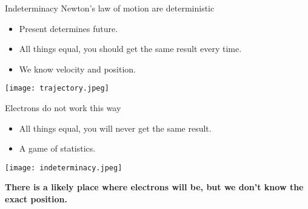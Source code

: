 \documentclass[notes=hide]{beamer}
\begin{document}
\begin{frame}[allowframebreaks=1]{Indeterminacy}
		Newton's law of motion are deterministic
			\begin{itemize}
				\item Present determines future.
				\item All things equal, you should get the same
					result every time.
				\item We know velocity and position.
			\end{itemize}
			\begin{center}
				\texttt{[image: trajectory.jpeg]}
			\end{center}

			\framebreak

		Electrons do not work this way
		\begin{itemize}
			\item All things equal, you will \alert{never}
				get the same result.
			\item A game of statistics.
		\end{itemize}

		\begin{center}
			\texttt{[image: indeterminacy.jpeg]}
		\end{center}

		\begin{center}
			\bfseries{} There is a likely place where electrons will be,
			but we don't know the exact position.
		\end{center}
\end{frame}
\end{document}
